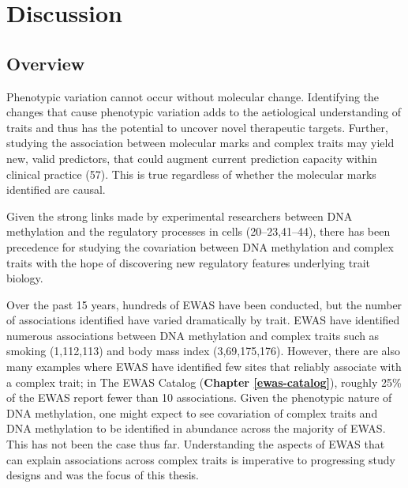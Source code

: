 \documentclass[11pt,twoside]{bristolthesis}
\begin{document}
\hypertarget{discussion-thesis}{%
\chapter{Discussion}\label{discussion-thesis}}

\hypertarget{overview-08}{%
\section{Overview}\label{overview-08}}

Phenotypic variation cannot occur without molecular change. Identifying the changes that cause phenotypic variation adds to the aetiological understanding of traits and thus has the potential to uncover novel therapeutic targets. Further, studying the association between molecular marks and complex traits may yield new, valid predictors, that could augment current prediction capacity within clinical practice (57). This is true regardless of whether the molecular marks identified are causal.

Given the strong links made by experimental researchers between DNA methylation and the regulatory processes in cells (20--23,41--44), there has been precedence for studying the covariation between DNA methylation and complex traits with the hope of discovering new regulatory features underlying trait biology.

Over the past 15 years, hundreds of EWAS have been conducted, but the number of associations identified have varied dramatically by trait. EWAS have identified numerous associations between DNA methylation and complex traits such as smoking (1,112,113) and body mass index (3,69,175,176). However, there are also many examples where EWAS have identified few sites that reliably associate with a complex trait; in The EWAS Catalog (\textbf{Chapter \ref{ewas-catalog}}), roughly 25\% of the EWAS report fewer than 10 associations. Given the phenotypic nature of DNA methylation, one might expect to see covariation of complex traits and DNA methylation to be identified in abundance across the majority of EWAS. This has not been the case thus far. Understanding the aspects of EWAS that can explain associations across complex traits is imperative to progressing study designs and was the focus of this thesis.
\end{document}
